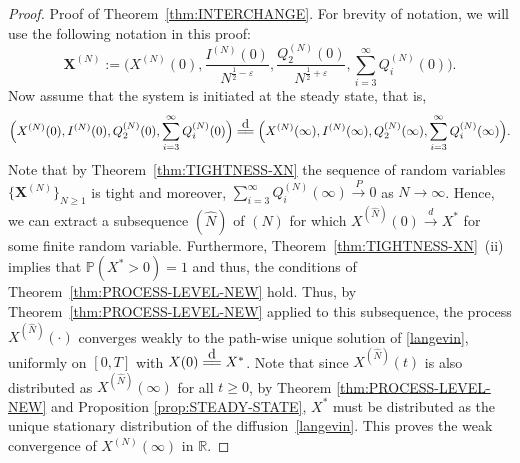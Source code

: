 \documentclass[11pt, reqno]{article}
\numberwithin{equation}{section}
\numberwithin{theorem}{section}
\newcommand\blue[1]{#1}
\newcommand\disteq{\stackrel{\mathclap{\normalfont\mbox{d}}}{=\joinrel=}}
\newcommand{\bX}{\mathbf{X}}
\newcommand{\R}{\mathbb{R}}                 %
\newcommand{\PP}{\mathbb{P}}  				%
\begin{document}

\begin{proof}{Proof of Theorem~\ref{thm:INTERCHANGE}.}
For brevity of notation, we will use the following notation in this proof:
\blue{$$\bX^{(N)}:=\Big(X^{(N)}(0), \frac{I^{(N)}(0)}{N^{\frac{1}{2} - \varepsilon}}, \frac{Q^{(N)}_2(0)}{N^{\frac{1}{2} + \varepsilon}}, \sum_{i=3}^{\infty}Q^{(N)}_i(0)\Big).$$}
Now assume that the system is initiated at the steady state, that is, $$\Big(X^{(N)}(0), I^{(N)}(0), Q_2^{(N)}(0), \sum_{i=3}^{\infty}Q^{(N)}_i(0)\Big)\disteq \Big(X^{(N)}(\infty), I^{(N)}(\infty), Q_2^{(N)}(\infty), \sum_{i=3}^{\infty}Q^{(N)}_i(\infty)\Big).$$ 
\blue{Note that by Theorem~\ref{thm:TIGHTNESS-XN} 
the sequence of random variables $\{\bX^{(N)}\}_{N\geq 1}$
is tight and moreover, $\sum_{i=3}^{\infty}Q^{(N)}_i(\infty) \xrightarrow{P} 0$ as $N \rightarrow \infty$. Hence, we can extract a subsequence $(\hat{N})$ of $(N)$ for which $X^{(\hat{N})}(0) \xrightarrow{d} X^*$ for some finite random variable. 
Furthermore, Theorem~\ref{thm:TIGHTNESS-XN}~(ii) implies that $\PP(X^*>0) = 1$ and thus, the conditions of Theorem~\ref{thm:PROCESS-LEVEL-NEW} hold. Thus, by Theorem~\ref{thm:PROCESS-LEVEL-NEW} applied to this subsequence, the process $X^{(\hat{N})}(\cdot)$ converges weakly to the path-wise unique solution of \eqref{langevin}, uniformly on $[0,T]$ with $X(0)\disteq X^*$. Note that since $X^{(\hat{N})}(t)$ is also distributed as $X^{(\hat{N})}(\infty)$ for all $t\geq 0$, by Theorem \ref{thm:PROCESS-LEVEL-NEW} and Proposition \ref{prop:STEADY-STATE}, $X^*$ must be distributed as the unique stationary distribution of the diffusion~\eqref{langevin}. 
This proves the weak convergence of $X^{(N)}(\infty)$ in $\R$.}




\end{proof}
\end{document}
